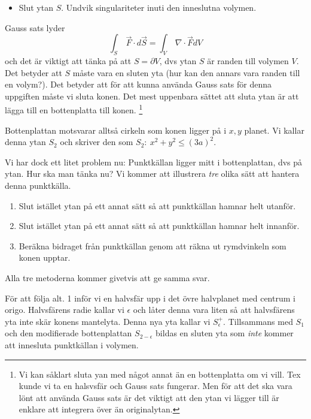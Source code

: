 \documentclass[%
oneside,                 %
final,                   %
10pt]{article}
\newenvironment{doconceexercise}{}{}
\begin{document}
\begin{doconceexercise}
\begin{itemize}
\item Slut ytan $S$. Undvik singulariteter inuti den inneslutna volymen.
\end{itemize}

\noindent
Gauss sats lyder 
\begin{equation}
\int_{S}\ \vec{F} \cdot d\vec{S} = \int_{V}\ \nabla \cdot \vec{F} dV
\end{equation} 
och det är viktigt att tänka på att $S=\partial V$, dvs ytan $S$ är randen till volymen $V$. Det betyder att $S$ måste vara en sluten yta (hur kan den annars vara randen till en volym?). Det betyder att för att kunna använda Gauss sats för denna uppgiften måste vi sluta konen. Det mest uppenbara sättet att sluta ytan är att lägga till en bottenplatta till konen. \footnote{Vi kan såklart sluta yan med något annat än en bottenplatta om vi vill. Tex kunde vi ta en halsvsfär och Gauss sats fungerar. Men för att det ska vara lönt att använda Gauss sats är det viktigt att den ytan vi lägger till är enklare att integrera över än originalytan.}

Bottenplattan motsvarar alltså cirkeln som konen ligger på i $x,y$ planet. Vi kallar denna ytan $S_2$ och skriver den som $S_2:\ x^2+y^2\leq (3a)^2$. 

Vi har dock ett litet problem nu: Punktkällan ligger mitt i bottenplattan, dvs på ytan. Hur ska man tänka nu? Vi kommer att illustrera \emph{tre} olika sätt att hantera denna punktkälla. 
\begin{enumerate}
\item Slut istället ytan på ett annat sätt så att punktkällan hamnar helt utanför.

\item Slut istället ytan på ett annat sätt så att punktkällan hamnar helt innanför.

\item Beräkna bidraget från punktkällan genom att räkna ut rymdvinkeln som konen upptar.
\end{enumerate}

\noindent
Alla tre metoderna kommer givetvis att ge samma svar. 

För att följa alt. 1 inför vi en halvsfär upp i det övre halvplanet med centrum i origo. Halvsfärens radie kallar vi $\epsilon$ och låter denna vara liten så att halvsfärens yta inte skär konens mantelyta. Denna nya yta kallar vi $S^+_\epsilon$. Tillsammans med $S_1$ och den modifierade bottenplattan $S_{2-\epsilon}$ bildas en sluten yta som \emph{inte} kommer att innesluta punktkällan i volymen. 


\end{doconceexercise}
\end{document}
